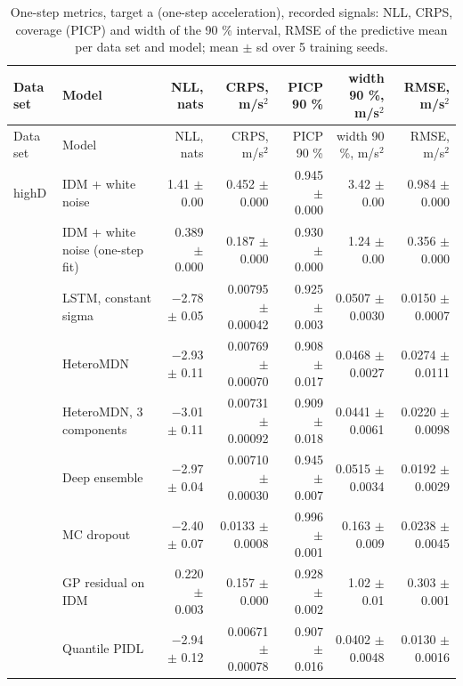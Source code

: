 \begingroup
\footnotesize
\begin{longtable}{llrrrrr}
\caption{One-step metrics, target a (one-step acceleration), recorded signals: NLL, CRPS, coverage (PICP) and width of the 90 \% interval, RMSE of the predictive mean per data set and model; mean $\pm$ sd over 5 training seeds.}\label{tab:t1-one-step--raw--a} \\
\toprule
Data set & Model & NLL, nats & CRPS, m/s$^2$ & PICP 90 \% & width 90 \%, m/s$^2$ & RMSE, m/s$^2$ \\
\midrule
\endfirsthead
\toprule
Data set & Model & NLL, nats & CRPS, m/s$^2$ & PICP 90 \% & width 90 \%, m/s$^2$ & RMSE, m/s$^2$ \\
\midrule
\endhead
\bottomrule
\endlastfoot
highD & IDM + white noise & 1.41 $\pm$ 0.00 & 0.452 $\pm$ 0.000 & 0.945 $\pm$ 0.000 & 3.42 $\pm$ 0.00 & 0.984 $\pm$ 0.000 \\
 & IDM + white noise (one-step fit) & 0.389 $\pm$ 0.000 & 0.187 $\pm$ 0.000 & 0.930 $\pm$ 0.000 & 1.24 $\pm$ 0.00 & 0.356 $\pm$ 0.000 \\
 & LSTM, constant sigma & $-$2.78 $\pm$ 0.05 & 0.00795 $\pm$ 0.00042 & 0.925 $\pm$ 0.003 & 0.0507 $\pm$ 0.0030 & 0.0150 $\pm$ 0.0007 \\
 & HeteroMDN & $-$2.93 $\pm$ 0.11 & 0.00769 $\pm$ 0.00070 & 0.908 $\pm$ 0.017 & 0.0468 $\pm$ 0.0027 & 0.0274 $\pm$ 0.0111 \\
 & HeteroMDN, 3 components & $-$3.01 $\pm$ 0.11 & 0.00731 $\pm$ 0.00092 & 0.909 $\pm$ 0.018 & 0.0441 $\pm$ 0.0061 & 0.0220 $\pm$ 0.0098 \\
 & Deep ensemble & $-$2.97 $\pm$ 0.04 & 0.00710 $\pm$ 0.00030 & 0.945 $\pm$ 0.007 & 0.0515 $\pm$ 0.0034 & 0.0192 $\pm$ 0.0029 \\
 & MC dropout & $-$2.40 $\pm$ 0.07 & 0.0133 $\pm$ 0.0008 & 0.996 $\pm$ 0.001 & 0.163 $\pm$ 0.009 & 0.0238 $\pm$ 0.0045 \\
 & GP residual on IDM & 0.220 $\pm$ 0.003 & 0.157 $\pm$ 0.000 & 0.928 $\pm$ 0.002 & 1.02 $\pm$ 0.01 & 0.303 $\pm$ 0.001 \\
 & Quantile PIDL & $-$2.94 $\pm$ 0.12 & 0.00671 $\pm$ 0.00078 & 0.907 $\pm$ 0.016 & 0.0402 $\pm$ 0.0048 & 0.0130 $\pm$ 0.0016 \\

\end{longtable}
